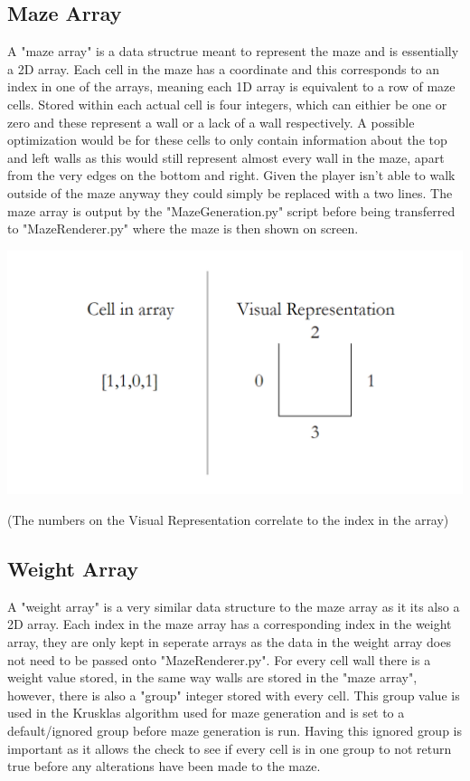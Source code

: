 \documentclass{article}
\begin{document}
\subsection{Maze Array}
A "maze array" is a data structrue meant to represent the maze and is essentially a 2D array. Each cell in the maze has a coordinate and this corresponds to an index in one of the arrays,
meaning each 1D array is equivalent to a row of maze cells. Stored within each actual cell is four integers, which can eithier be one or zero and these represent a wall or a lack of a wall
respectively. A possible optimization would be for these cells to only contain information about the top and left walls as this would still represent almost every wall in the maze, apart from
the very edges on the bottom and right. Given the player isn't able to walk outside of the maze anyway they could simply be replaced with a two lines. The maze array is output by the 
"MazeGeneration.py" script before being transferred to "MazeRenderer.py" where the maze is then shown on screen.
\begin{center}
	\includegraphics[scale=0.5]{Maze Cell Diagram}

	\color{mygrey}(The numbers on the Visual Representation correlate to the index in the array)
\end{center}
\subsection{Weight Array}
A "weight array" is a very similar data structure to the maze array as it its also a 2D array. Each index in the maze array has a corresponding index in the weight array, they are only kept
in seperate arrays as the data in the weight array does not need to be passed onto "MazeRenderer.py". For every cell wall there is a weight value stored, in the same way walls are stored in 
the "maze array", however, there is also a "group" integer stored with every cell. This group value is used in the Krusklas algorithm used for maze generation and is set to a default/ignored group before maze
generation is run. Having this ignored group is important as it allows the check to see if every cell is in one group to not return true before any alterations have been made to
the maze.
\end{document}
